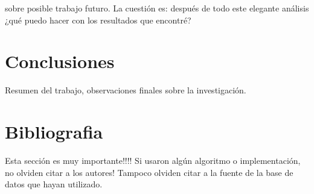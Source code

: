 \documentclass[sigconf]{acmart}
\begin{document}
sobre posible trabajo futuro.  La cuestión es: después de todo este elegante análisis ¿qué puedo hacer con los resultados que encontré?
\section{Conclusiones}
Resumen del trabajo, observaciones finales sobre la investigación. 


\section{Bibliografia}
 Esta sección es muy importante!!!! Si usaron algún algoritmo o implementación, no olviden citar a los autores! Tampoco olviden citar a la fuente de la base de datos que hayan utilizado. 
\end{document}
